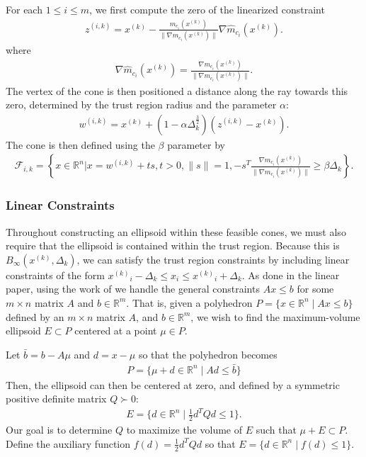 \documentclass{article}
\theoremstyle{case}
\newcommand{\xk}{{x^{(k)}}}
\newcommand{\Rn}{\mathbb R^n}
\newcommand{\Rm}{\mathbb R^m}
\newcommand{\dk}{\Delta_k}
\newcommand{\zik}{{z^{(i, k)}}}
\newcommand{\fik}{{\mathcal F_{i, k}}}
\newcommand{\rn}{{\mathbb R^{n}}}
\newcommand{\wik}{{w^{(i, k)}}}
\newcommand{\gmcik}{{\nabla m_{c_i}(\xk)}}
\newcommand{\hgik}{{\frac{\nabla m_{c_i}(\xk)}{\|\nabla m_{c_i}(\xk)\|}}}
\newcommand{\hgmcik}{{\nabla \hat m_{c_i}(\xk)}}
\newcommand{\tr}{{ B_{\infty}\left(\xk, \dk\right) }}
\begin{document}
For each $1\le i\le m$, we first compute the zero of the linearized constraint
\begin{align}
\zik = \xk - \frac{m_{c_i}(\xk)}{\|\gmcik\|} \hgmcik. \label{def_z}
\end{align}
where
\begin{align}
\hgmcik = \frac{\nabla m_{c_i}(\xk)}{\|\nabla m_{c_i}(\xk)\|}. \label{def_normalized_gradient}
\end{align}
The vertex of the cone is then positioned a distance along the ray towards this zero, determined by the trust region radius and the parameter $\alpha$:
\begin{align}
\wik = \xk + \left(1 - \alpha\dk^{\frac 3 2}\right)\left(\zik - \xk\right). \label{def_w}
\end{align}
The cone is then defined using the $\beta$ parameter by
\begin{align}
\fik = \left\{x \in \rn | x = \wik + t s,t > 0, \|s\| = 1, -s^T\hgik \ge \beta \dk \right\}. \label{def_f}
\end{align}




\subsubsection{Linear Constraints}

Throughout constructing an ellipsoid within these feasible cones, we must also require that the ellipsoid is contained within the trust region.
Because this is $\tr$, we can satisfy the trust region constraints by including linear constraints of the form $\xk_i - \dk \le x_i \le \xk_i + \dk$.
As done in the linear paper, using the work of \cite{Khachiyan1993} we handle the general constraints $Ax \le b$ for some $m\times n$ matrix $A$ and $b \in \Rm$.
That is, given a polyhedron $P = \{ x \in \Rn\; | \;  Ax \le b \}$ defined by an $m \times n$ matrix $A$, and $b \in \Rm$,
we wish to find the maximum-volume ellipsoid $E \subset P$ centered at a point $\mu \in P$.

Let $\bar{b} = b - A\mu$ and $d = x - \mu$ so that the polyhedron becomes
\begin{align*}
P = \{ \mu + d \in \Rn \; | \;  Ad \le \bar{b} \}
\end{align*}
Then, the ellipsoid can then be centered at zero, and defined by a symmetric positive definite matrix $Q \succ 0$:
\begin{align*}
E = \{ d \in \Rn \; | \; \frac 1 2 d^T Q d \le 1 \}.
\end{align*}
Our goal is to determine $Q$ to maximize the volume of $E$ such that $\mu + E \subset P$.
Define the auxiliary function $f(d) = \frac 1 2 d^T Q d$ so that $E = \{ d \in \Rn\; | \; f(d) \le 1 \}$.
\end{document}
